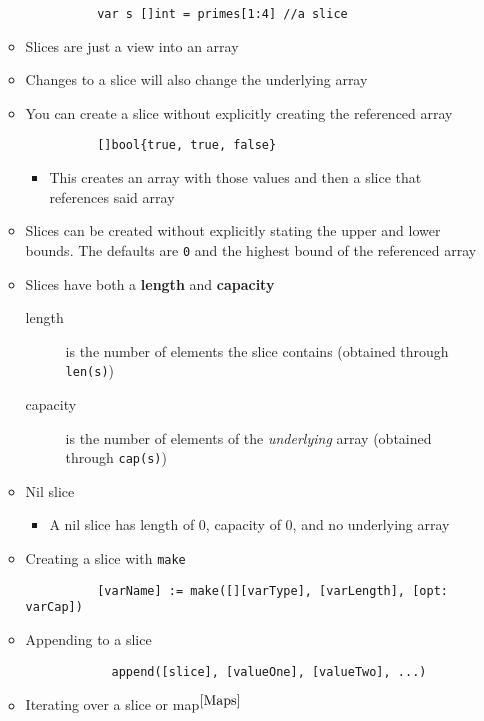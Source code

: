 \documentclass[11pt, oneside]{article}   	%
\begin{document}
\begin{itemize}
\begin{itemize}
\begin{verbatim}
          var s []int = primes[1:4] //a slice
        \end{verbatim}
        \item Slices are just a view into an array
        \item Changes to a slice will also change the underlying array
        \item You can create a slice without explicitly creating the referenced array
        \begin{verbatim}
          []bool{true, true, false}
        \end{verbatim}
          \begin{itemize}
            \item This creates an array with those values and then a slice that references said array
          \end{itemize}
        \item Slices can be created without explicitly stating the upper and lower bounds. The defaults are \texttt{0} and the highest bound of the referenced array
        \item Slices have both a \textbf{length} and \textbf{capacity}
          \begin{description}
            \item[length] is the number of elements the slice contains (obtained through \texttt{len(s)})
            \item[capacity] is the number of elements of the \emph{underlying} array (obtained through \texttt{cap(s)})
          \end{description}
        \item Nil slice
          \begin{itemize}
            \item A nil slice has length of 0, capacity of 0, and no underlying array
          \end{itemize}
        \item Creating a slice with \texttt{make}
          \begin{verbatim}
          [varName] := make([][varType], [varLength], [opt: varCap])
          \end{verbatim}
        \item Appending to a slice
          \begin{verbatim}
            append([slice], [valueOne], [valueTwo], ...)
          \end{verbatim}
        \item Iterating over a slice or map$^{\ref{Maps}}$

\end{itemize}
\end{itemize}
\end{document}
